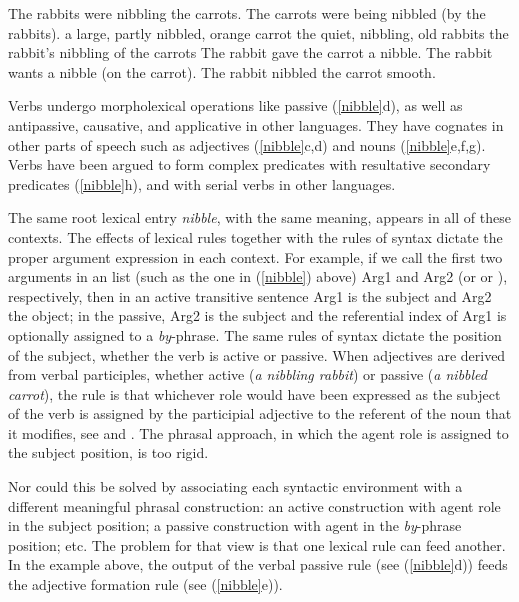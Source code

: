 \documentclass[output=paper
                ,modfonts
                ,nonflat
	        ,collection
	        ,collectionchapter
	        ,collectiontoclongg
 	        ,biblatex
                ,babelshorthands
                ,newtxmath
                ,draftmode
                ,colorlinks, citecolor=brown
]{./langsci/langscibook}
\begin{document}
\begin{exe}
\ex \label{nibble}
\begin{xlist}
\ex  The rabbits were nibbling the carrots.  
\ex  The carrots were being nibbled (by the rabbits).
\ex  a large, partly nibbled, orange carrot 
\ex  the quiet, nibbling, old rabbits
\ex  the rabbit's nibbling of the carrots
\ex  The rabbit gave the carrot a nibble.  
\ex  The rabbit wants a nibble (on the carrot).  
\ex  The rabbit nibbled the carrot smooth.
\end{xlist}
\end{exe}

\noindent
Verbs undergo  morpholexical operations like passive
(\ref{nibble}d), as well as antipassive, causative, and applicative in other languages.  They have cognates in
other parts of speech such as adjectives  (\ref{nibble}c,d) and nouns  (\ref{nibble}e,f,g).  
Verbs have been argued to form complex predicates with resultative secondary predicates (\ref{nibble}h), and with serial verbs in other languages.   

The same root lexical entry \emph{nibble}, with the same meaning, appears in all of these contexts.
The effects of lexical rules together with the rules of syntax dictate the proper argument
expression in each context.  For example, if we call the first two arguments in an \argst list
(such as the one in (\ref{nibble}) above) Arg1 and Arg2 (or  or ), respectively, then in an active
transitive sentence Arg1 is the subject and Arg2 the object; in the passive, Arg2 is the subject and
the referential index of Arg1 is optionally assigned to a \emph{by}-phrase.  The same rules of
syntax dictate the position of the subject, whether the verb is active or passive.  When adjectives
are derived from verbal participles, whether active (\emph{a nibbling rabbit}) or passive (\emph{a
  nibbled carrot}), the rule is that whichever role would have been expressed as the subject of the
verb is assigned by the participial adjective to the referent of the noun that it modifies, see \citet{Bresnan:1982passive} 
and \citet[Chapter~3]{Bresnan+etal:2015}.  
The phrasal approach, in which the agent role is assigned to the subject position, is too rigid.  

Nor could this be solved by associating each syntactic environment with a different meaningful phrasal construction: an active construction with agent role in the subject position; a passive construction with agent in the \textit{by}-phrase position; etc.  The problem for that view is that one lexical rule can feed another.  In the example above, the output of the verbal passive rule (see (\ref{nibble}d)) feeds the adjective formation rule (see (\ref{nibble}e)).  
 
\end{document}
